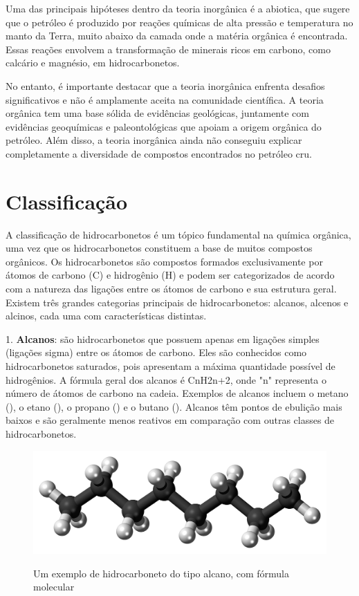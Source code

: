 Uma das principais hipóteses dentro da teoria inorgânica é a abiotica, que sugere que o petróleo é produzido por reações químicas de alta pressão e temperatura no manto da Terra, muito abaixo da camada onde a matéria orgânica é encontrada. Essas reações envolvem a transformação de minerais ricos em carbono, como calcário e magnésio, em hidrocarbonetos.

No entanto, é importante destacar que a teoria inorgânica enfrenta desafios significativos e não é amplamente aceita na comunidade científica. A teoria orgânica tem uma base sólida de evidências geológicas, juntamente com evidências geoquímicas e paleontológicas que apoiam a origem orgânica do petróleo. Além disso, a teoria inorgânica ainda não conseguiu explicar completamente a diversidade de compostos encontrados no petróleo cru.

\section{Classificação}
A classificação de hidrocarbonetos é um tópico fundamental na química orgânica, uma vez que os hidrocarbonetos constituem a base de muitos compostos orgânicos. Os hidrocarbonetos são compostos formados exclusivamente por átomos de carbono (C) e hidrogênio (H) e podem ser categorizados de acordo com a natureza das ligações entre os átomos de carbono e sua estrutura geral. Existem três grandes  categorias principais de hidrocarbonetos: alcanos, alcenos e alcinos, cada uma com características distintas.

1. \textbf{Alcanos}: são hidrocarbonetos que possuem apenas em ligações simples (ligações sigma) entre os átomos de carbono. Eles são conhecidos como hidrocarbonetos saturados, pois apresentam a máxima quantidade possível de hidrogênios. A fórmula geral dos alcanos é CnH2n+2, onde "n" representa o número de átomos de carbono na cadeia. Exemplos de alcanos incluem o metano (), o etano (), o propano () e o butano (). Alcanos têm pontos de ebulição mais baixos e são geralmente menos reativos em comparação com outras classes de hidrocarbonetos.

\begin{figure}[h]\centering
\caption{Um exemplo de hidrocarboneto do tipo alcano, com fórmula molecular }
\includegraphics[scale=0.15]{imagens/Octane_3D_ball.png}
\label{fig:alcano}\vspace{0.5cm}\end{figure}

